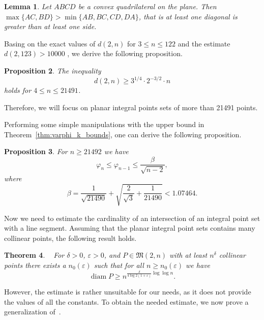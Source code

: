 \documentclass[a4paper,14pt]{article} %
\theoremstyle{plain}
\newtheorem{theorem}{Theorem}[section]
\newtheorem{lemma}[theorem]{Lemma}
\newtheorem{proposition}[theorem]{Proposition}
\theoremstyle{definition}
\begin{document}
\begin{lemma}
	\label{lemma:quadr_diag_edges}
	Let $ABCD$ be a convex quadrilateral on the plane.
	Then $\max\{AC,BD\}>\min\{AB,BC,CD,DA\}$,
	that is at least one diagonal is greater than at least one side.
\end{lemma}


Basing on the exact values of $d(2,n)$ for $ 3 \leq n\leq 122$ and the estimate $d(2,123)>10000$
\cite{kurz2008bounds}, we derive the following proposition.
\begin{proposition}
	\label{obs:4_leq_n_leq_21491}
	The inequality
	\begin{equation}
		d(2,n) \geq 3^{1/4}\cdot2^{-3/2} \cdot n
	\end{equation}
	holds for $4 \leq n \leq 21491$.
\end{proposition}

Therefore, we will focus on planar integral points sets of more than 21491 points.

Performing some simple manipulations with the upper bound in Theorem~\ref{thm:varphi_k_bounds},
one can derive the following proposition.
\begin{proposition}
	\label{varphi_n_where_n_geq_21492}
	For $n \geq 21492$ we have
	\begin{equation}
		\varphi_n \leq \varphi_{n-1} \leq \frac{\beta}{\sqrt{n-2}}
		,
	\end{equation}
	where
	\begin{equation}
		\beta = \frac{1}{\sqrt{21490}} + \sqrt{ \frac{2}{\sqrt{3}} + \frac{1}{21490} } < 1.07464
		.
	\end{equation}
\end{proposition}

Now we need to estimate the cardinality of an intersection of an integral point set with a line segment.
Assuming that the planar integral point sets contains many collinear points,
the following result holds.
\begin{theorem}~\cite[Theorem 4]{kurz2008minimum}
	For $\delta > 0$, $\varepsilon > 0$, and $P\in\mathfrak{M}(2,n)$ with
	at least $n^\delta$ collinear points there exists a $n_0 (\varepsilon)$
	such that for all $n \geq n_0 (\varepsilon)$ we have
	\begin{equation}
		\operatorname{diam} P \geq n^{\frac{\delta}{4 \log 2(1+\varepsilon)}\log \log n}
		.
	\end{equation}
\end{theorem}
However, the estimate is rather unsuitable for our needs,
as it does not provide the values of all the constants.
To obtain the needed estimate, we now prove a generalization of~\cite[lemma 3]{our-vmmsh-2018}.
\end{document}
